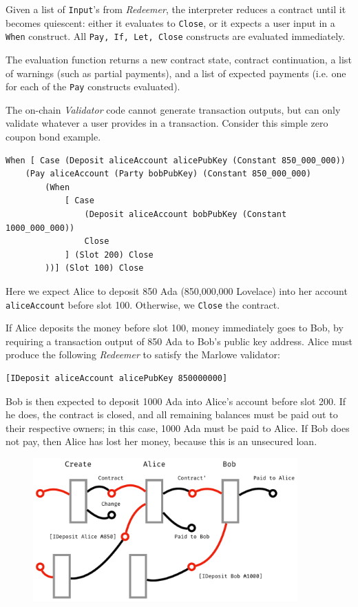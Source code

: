 \documentclass[runningheads]{llncs}
\begin{document}
Given a list of \texttt{Input}'s from \emph{Redeemer}, the interpreter reduces a contract until it becomes quiescent: either it evaluates to \texttt{Close},
or it expects a user input in a \texttt{When} construct.
All \texttt{Pay, If, Let, Close} constructs are evaluated immediately.

The evaluation function returns a new contract state, contract continuation, a list of warnings (such as partial payments),
and a list of expected payments (i.e. one for each of the \texttt{Pay} constructs evaluated).

The on-chain \emph{Validator} code cannot generate transaction outputs,
but can only validate whatever a user provides in a transaction.
Consider this simple zero coupon bond example.

\begin{verbatim}
When [ Case (Deposit aliceAccount alicePubKey (Constant 850_000_000))
    (Pay aliceAccount (Party bobPubKey) (Constant 850_000_000)
        (When
            [ Case
                (Deposit aliceAccount bobPubKey (Constant 1000_000_000))
                Close
            ] (Slot 200) Close
        ))] (Slot 100) Close
\end{verbatim}

\noindent
Here we expect Alice to deposit 850 Ada (850,000,000 Lovelace) into her account \texttt{aliceAccount} before slot 100.
Otherwise, we \texttt{Close} the contract.

If Alice deposits the money before slot 100, money immediately goes to Bob,
by requiring a transaction output of 850 Ada to Bob's public key address.
Alice must produce the following \emph{Redeemer} to satisfy the Marlowe validator:

\begin{verbatim}
[IDeposit aliceAccount alicePubKey 850000000]
\end{verbatim}

\noindent
Bob is then expected to deposit 1000 Ada into Alice's account before slot 200.
If he does, the contract is closed, and all remaining balances must be paid out
to their respective owners; in this case, 1000 Ada must be paid to Alice. If Bob does not pay, then Alice has lost her money, because this is an unsecured loan.

\begin{figure}[!h]
    \centering
    \includegraphics[width=4in]{figures/Marlowe3-Figure-2-crop.pdf}
\end{figure}
\end{document}
